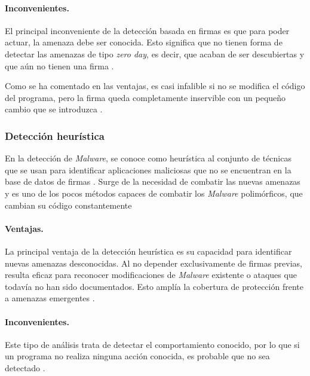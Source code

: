 \vspace{1em}

\paragraph*{\textbf{Inconvenientes.}}
El principal inconveniente de la detección basada en firmas es que para poder actuar, la amenaza debe ser conocida. Esto significa que no tienen forma de detectar las amenazas de tipo \textit{zero day}, es decir, que acaban de ser descubiertas y que aún no tienen una firma \cite{zeroday}.

\noindent Como se ha comentado en las ventajas, es casi infalible si no se modifica el código del programa, pero la firma queda completamente inservible con un pequeño cambio que se introduzca \cite{firmas}.

\subsubsection{Detección heurística}
\label{subsubsec:heuristica}

En la detección de \textit{Malware}, se conoce como heurística al conjunto de técnicas que se usan para identificar aplicaciones maliciosas que no se encuentran en la base de datos de firmas \cite{heu}. Surge de la necesidad de combatir las nuevas amenazas y es uno de los pocos métodos capaces de combatir los \textit{Malware} polimórficos, que cambian su código constantemente \cite{kp_heu}

\vspace{1em}

\paragraph*{\textbf{Ventajas.}}
La principal ventaja de la detección heurística es su capacidad para identificar nuevas amenazas desconocidas. Al no depender exclusivamente de firmas previas, resulta eficaz para reconocer modificaciones de \textit{Malware} existente o ataques que todavía no han sido documentados. Esto amplía la cobertura de protección frente a amenazas emergentes \cite{fortinet_heu}.

\paragraph*{\textbf{Inconvenientes.}}
Este tipo de análisis trata de detectar el comportamiento conocido, por lo que si un programa no realiza ninguna acción conocida, es probable que no sea detectado \cite{fortinet_heu}.

